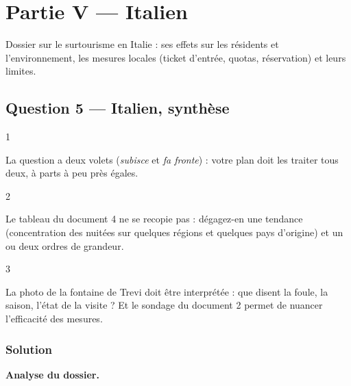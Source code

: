 \documentclass[11pt,a4paper]{article}
\begin{document}
\hypertarget{partie-v-italien}{%
\section{Partie V --- Italien}\label{partie-v-italien}}

Dossier sur le surtourisme en Italie : ses effets sur les résidents et l'environnement, les mesures locales (ticket d'entrée, quotas, réservation) et leurs limites.

\hypertarget{question-5-italien-synthuxe8se}{%
\subsection{Question 5 --- Italien, synthèse}\label{question-5-italien-synthuxe8se}}

\begin{indication}{1}

La question a deux volets (\emph{subisce} et \emph{fa fronte}) : votre plan doit les traiter tous deux, à parts à peu près égales.

\end{indication}

\begin{indication}{2}

Le tableau du document 4 ne se recopie pas : dégagez-en une tendance (concentration des nuitées sur quelques régions et quelques pays d'origine) et un ou deux ordres de grandeur.

\end{indication}

\begin{indication}{3}

La photo de la fontaine de Trevi doit être interprétée : que disent la foule, la saison, l'état de la visite ? Et le sondage du document 2 permet de nuancer l'efficacité des mesures.

\end{indication}

\hypertarget{solution-4}{%
\subsubsection{Solution}\label{solution-4}}

\textbf{Analyse du dossier.}
\end{document}
